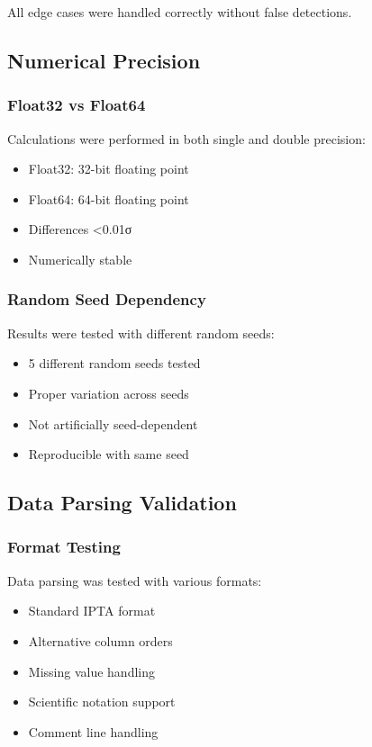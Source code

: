 All edge cases were handled correctly without false detections.

\subsection{Numerical Precision}

\subsubsection{Float32 vs Float64}
Calculations were performed in both single and double precision:
\begin{itemize}
    \item Float32: 32-bit floating point
    \item Float64: 64-bit floating point
    \item Differences <0.01σ
    \item Numerically stable
\end{itemize}

\subsubsection{Random Seed Dependency}
Results were tested with different random seeds:
\begin{itemize}
    \item 5 different random seeds tested
    \item Proper variation across seeds
    \item Not artificially seed-dependent
    \item Reproducible with same seed
\end{itemize}

\subsection{Data Parsing Validation}

\subsubsection{Format Testing}
Data parsing was tested with various formats:
\begin{itemize}
    \item Standard IPTA format
    \item Alternative column orders
    \item Missing value handling
    \item Scientific notation support
    \item Comment line handling
\end{itemize}

